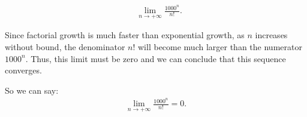 \documentclass{report}
\begin{document}

    \begin{align*}
        &\lim\limits_{n \to +\infty}{\frac{1000^{n}}{n!}}    
    .\end{align*}
    \bigbreak \noindent 
    \begin{prop}
       Since factorial growth is much faster than exponential growth, as $n$ increases without bound, the denominator $n!$ will become much larger than the numerator $1000^{n}$. Thus, this limit must be zero and we can conclude that this sequence converges.
    \end{prop}
    \bigbreak \noindent 
    So we can say:
    \begin{align*}
        \lim\limits_{n \to +\infty}{\frac{1000^{n}}{n!}} = 0
    .\end{align*}
    




    
    



    
    
\end{document}
